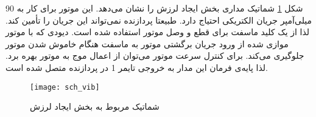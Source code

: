 شکل \ref{fig:sch-vib} شماتیک مداری بخش ایجاد لرزش را نشان می‌دهد. این موتور برای کار به 90 میلی‌آمپر جریان الکتریکی احتیاج دارد. طبیعتا پردازنده نمی‌تواند این جریان را تأمین کند. لذا از یک کلید ماسفت برای قطع و وصل موتور استفاده شده است. دیودی که با موتور موازی شده از ورود جریان برگشتی موتور به ماسفت هنگام خاموش شدن موتور جلوگیری می‌کند. برای کنترل سرعت موتور می‌توان از اعمال موج  به موتور بهره برد. لذا پایه‌ی فرمان این مدار به خروجی  تایمر 1 در پردازنده متصل شده است.

\begin{figure}[h]
	\centering
	\texttt{[image: sch\_vib]}
	\caption{شماتیک مربوط به بخش ایجاد لرزش}
	\label{fig:sch-vib}
\end{figure}



